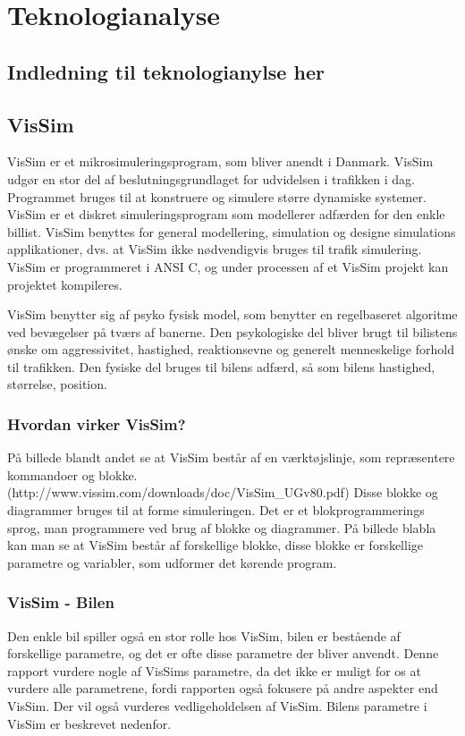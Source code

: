 \chapter{Teknologianalyse}\label{Teknologianalyse}

\section{Indledning til teknologianylse her}

\section{VisSim}
VisSim er et mikrosimuleringsprogram, som bliver anendt i Danmark. VisSim udgør en stor del af beslutningsgrundlaget for udvidelsen i trafikken i dag. Programmet bruges til at konstruere og simulere større dynamiske systemer. VisSim er et diskret simuleringsprogram som modellerer adfærden for den enkle billist. VisSim benyttes for general modellering, simulation og designe simulations applikationer, dvs. at VisSim ikke nødvendigvis bruges til trafik simulering. VisSim er programmeret i ANSI C, og under processen af et VisSim projekt kan projektet kompileres.

VisSim benytter sig af psyko fysisk model, som benytter en regelbaseret algoritme ved bevægelser på tværs af banerne. Den psykologiske del bliver brugt til bilistens ønske om aggressivitet, hastighed, reaktionsevne og generelt menneskelige forhold til trafikken. Den fysiske del bruges til bilens adfærd, så som bilens hastighed, størrelse, position. 


\subsection{Hvordan virker VisSim?}
På billede blandt andet se at VisSim består af en værktøjslinje, som repræsentere kommandoer og blokke.(http://www.vissim.com/downloads/doc/VisSim\_UGv80.pdf)
Disse blokke og diagrammer bruges til at forme simuleringen. Det er et blokprogrammerings sprog, man programmere ved brug af blokke og diagrammer. På billede blabla kan man se at VisSim består af forskellige blokke, disse blokke er forskellige parametre og variabler, som udformer det kørende program.


\subsection{VisSim - Bilen}
Den enkle bil spiller også en stor rolle hos VisSim, bilen er bestående af forskellige parametre, og det er ofte disse parametre der bliver anvendt. Denne rapport vurdere nogle af VisSims parametre, da det ikke er muligt for os at vurdere alle parametrene, fordi rapporten også fokusere på andre aspekter end VisSim. Der vil også vurderes vedligeholdelsen af VisSim. Bilens parametre i VisSim er beskrevet nedenfor.


